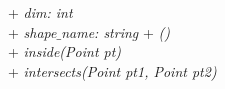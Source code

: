 {
+ \textit{dim: int} \\
+ \textit{shape$\_$name: string}
}
{
+ \textit{\dunder()}\\
+ \textit{inside(Point pt)} \\
+ \textit{intersects(Point pt1, Point pt2)}
}